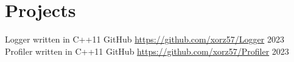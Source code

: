 \section{Projects}

\begin{itemize}
    \cventryiv
        {Logger written in C++11}
        {GitHub}
        {\url{https://github.com/xorz57/Logger}}
        {2023}
    \cventryiv
        {Profiler written in C++11}
        {GitHub}
        {\url{https://github.com/xorz57/Profiler}}
        {2023}
\end{itemize}
